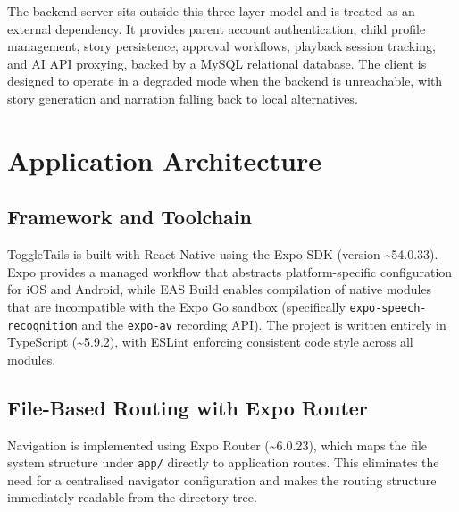 The backend server sits outside this three-layer model and is treated as an external dependency. It provides parent account authentication, child profile management, story persistence, approval workflows, playback session tracking, and AI API proxying, backed by a MySQL relational database. The client is designed to operate in a degraded mode when the backend is unreachable, with story generation and narration falling back to local alternatives.

\section{Application Architecture}

\subsection*{Framework and Toolchain}

ToggleTails is built with React Native using the Expo SDK (version \textasciitilde54.0.33). Expo provides a managed workflow that abstracts platform-specific configuration for iOS and Android, while EAS Build enables compilation of native modules that are incompatible with the Expo Go sandbox (specifically \texttt{expo-speech-recognition} and the \texttt{expo-av} recording API). The project is written entirely in TypeScript (\textasciitilde5.9.2), with ESLint enforcing consistent code style across all modules.

\subsection*{File-Based Routing with Expo Router}

Navigation is implemented using Expo Router (\textasciitilde6.0.23), which maps the file system structure under \texttt{app/} directly to application routes. This eliminates the need for a centralised navigator configuration and makes the routing structure immediately readable from the directory tree.


